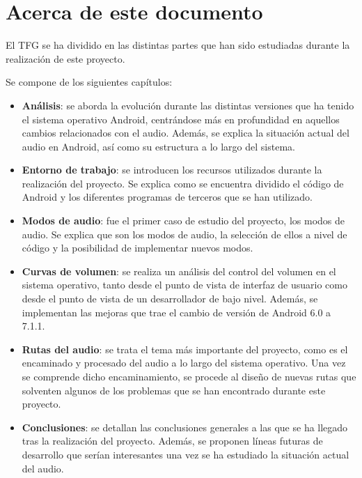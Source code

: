 \section{Acerca de este documento}
El \gls{TFG} se ha dividido en las distintas partes que han sido estudiadas durante la realización de este proyecto.

Se compone de los siguientes capítulos:
\begin{itemize}
	\item{\textbf{Análisis}: se aborda la evolución durante las distintas versiones que ha tenido el sistema operativo Android, centrándose más en profundidad en aquellos cambios relacionados con el audio. Además, se explica la situación actual del audio en Android, así como su estructura a lo largo del sistema.}
	\item{\textbf{Entorno de trabajo}: se introducen los recursos utilizados durante la realización del proyecto. Se explica como se encuentra dividido el código de Android y los diferentes programas de terceros que se han utilizado.}
	\item{\textbf{Modos de audio}: fue el primer caso de estudio del proyecto, los modos de audio. Se explica que son los modos de audio, la selección de ellos a nivel de código y la posibilidad de implementar nuevos modos.}
	\item{\textbf{Curvas de volumen}: se realiza un análisis del control del volumen en el sistema operativo, tanto desde el punto de vista de interfaz de usuario como desde el punto de vista de un desarrollador de bajo nivel. Además, se implementan las mejoras que trae el cambio de versión de Android 6.0 a 7.1.1.}
	\item{\textbf{Rutas del audio}: se trata el tema más importante del proyecto, como es el encaminado y procesado del audio a lo largo del sistema operativo. Una vez se comprende dicho encaminamiento, se procede al diseño de nuevas rutas que solventen algunos de los problemas que se han encontrado durante este proyecto.}
	\item{\textbf{Conclusiones}: se detallan las conclusiones generales a las que se ha llegado tras la realización del proyecto. Además, se proponen líneas futuras de desarrollo que serían interesantes una vez se ha estudiado la situación actual del audio.}
\end{itemize}
